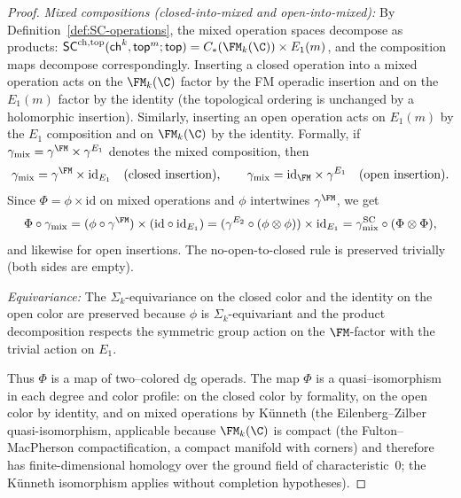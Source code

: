 \begin{proof}
\smallskip\noindent
\emph{Mixed compositions (closed-into-mixed and open-into-mixed):}
By Definition~\ref{def:SC-operations}, the mixed operation spaces
decompose as products:
$\mathsf{SC}^{\mathrm{ch,top}}(\mathsf{ch}^k, \mathsf{top}^m; \mathsf{top})
= C_\ast(\FM_k(\C)) \times E_1(m)$,
and the composition maps decompose correspondingly. Inserting a
closed operation into a mixed operation acts on the $\FM_k(\C)$
factor by the FM operadic insertion and on the $E_1(m)$ factor by
the identity (the topological ordering is unchanged by a holomorphic
insertion). Similarly, inserting an open operation acts on $E_1(m)$
by the $E_1$ composition and on $\FM_k(\C)$ by the identity.
Formally, if $\gamma_{\mathrm{mix}} = \gamma^{\FM} \times \gamma^{E_1}$
denotes the mixed composition, then
\[
 \gamma_{\mathrm{mix}} = \gamma^{\FM} \times \mathrm{id}_{E_1}
 \quad\text{(closed insertion)},
 \qquad
 \gamma_{\mathrm{mix}} = \mathrm{id}_{\FM} \times \gamma^{E_1}
 \quad\text{(open insertion)}.
\]
Since $\Phi = \phi \times \mathrm{id}$ on mixed operations and
$\phi$ intertwines $\gamma^{\FM}$, we get
\[
 \Phi \circ \gamma_{\mathrm{mix}}
 = (\phi \circ \gamma^{\FM}) \times (\mathrm{id} \circ \mathrm{id}_{E_1})
 = (\gamma^{E_2} \circ (\phi \otimes \phi)) \times \mathrm{id}_{E_1}
 = \gamma_{\mathrm{mix}}^{\mathrm{SC}} \circ (\Phi \otimes \Phi),
\]
and likewise for open insertions. The no-open-to-closed rule is
preserved trivially (both sides are empty).

\smallskip\noindent
\emph{Equivariance:}
The $\Sigma_k$-equivariance on the closed color and the identity on
the open color are preserved because $\phi$ is $\Sigma_k$-equivariant
and the product decomposition respects the symmetric group
action on the $\FM$-factor with the trivial action on $E_1$.

\smallskip
Thus $\Phi$ is a map of two--colored dg operads. The map $\Phi$ is a
quasi--isomorphism in each degree and color profile: on the closed color by
formality, on the open color by identity, and on mixed operations by
K\"unneth (the Eilenberg--Zilber quasi-isomorphism, applicable because
$\FM_k(\C)$ is compact (the Fulton--MacPherson compactification,
a compact manifold with corners) and therefore has finite-dimensional
homology over the ground field of characteristic~$0$; the K\"unneth
isomorphism applies without completion hypotheses).


\end{proof}
